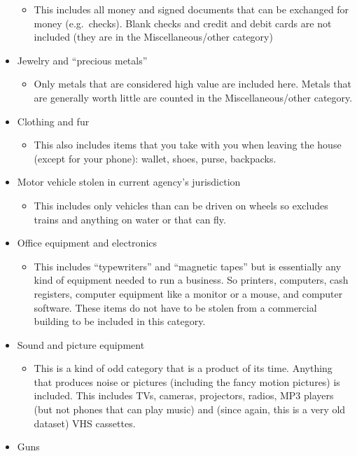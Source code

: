 \documentclass[
  12pt,
  openany]{book}
\providecommand{\tightlist}{%
  \setlength{\itemsep}{0pt}\setlength{\parskip}{0pt}}
\begin{document}
\begin{itemize}
  \begin{itemize}
  \tightlist
  \item
    This includes all money and signed documents that can be exchanged for money (e.g.~checks). Blank checks and credit and debit cards are not included (they are in the Miscellaneous/other category)
  \end{itemize}
\item
  Jewelry and ``precious metals''

  \begin{itemize}
  \tightlist
  \item
    Only metals that are considered high value are included here. Metals that are generally worth little are counted in the Miscellaneous/other category.
  \end{itemize}
\item
  Clothing and fur

  \begin{itemize}
  \tightlist
  \item
    This also includes items that you take with you when leaving the house (except for your phone): wallet, shoes, purse, backpacks.
  \end{itemize}
\item
  Motor vehicle stolen in current agency's jurisdiction

  \begin{itemize}
  \tightlist
  \item
    This includes only vehicles than can be driven on wheels so excludes trains and anything on water or that can fly.
  \end{itemize}
\item
  Office equipment and electronics

  \begin{itemize}
  \tightlist
  \item
    This includes ``typewriters'' and ``magnetic tapes'' but is essentially any kind of equipment needed to run a business. So printers, computers, cash registers, computer equipment like a monitor or a mouse, and computer software. These items do not have to be stolen from a commercial building to be included in this category.
  \end{itemize}
\item
  Sound and picture equipment

  \begin{itemize}
  \tightlist
  \item
    This is a kind of odd category that is a product of its time. Anything that produces noise or pictures (including the fancy motion pictures) is included. This includes TVs, cameras, projectors, radios, MP3 players (but not phones that can play music) and (since again, this is a very old dataset) VHS cassettes.
  \end{itemize}
\item
  Guns


\end{itemize}
\end{document}
